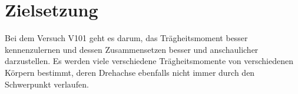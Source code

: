 \section{Zielsetzung} 

\begin{flushleft}
    Bei dem Versuch V101 geht es darum, das Trägheitsmoment besser kennenzulernen und dessen Zusammensetzen besser und
    anschaulicher darzustellen. Es werden viele verschiedene Trägheitsmomente von verschiedenen Körpern bestimmt, deren Drehachse ebenfalls nicht immer durch den Schwerpunkt verlaufen.
\end{flushleft}